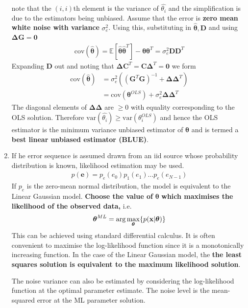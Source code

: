 \documentclass[a4paper]{article}
\newcommand{\ix}[1]{%
  \leavevmode %
  \marginpar{\small\emph{#1}}%
}
\newcommand{\expt}[1]{%
  \mathbb{E}[#1]
}
\newcommand{\vect}[1]{\boldsymbol{\mathbf{#1}}}
\DeclarePairedDelimiter{\mybrace}{\lbrace}{\rbrace}
\begin{document}
\begin{enumerate}
note that the \((i, i)\)th element is the variance of \(\hat{\theta_i}\) and the simplification is due to the estimators being unbiased. Assume that the error is \textbf{zero mean white noise with variance} \(\sigma_e^2\). Using this, substituting in \(\vect{\hat{\theta}}, \vect{D}\) and using \(\vect{\Delta G=0}\)
\begin{align*}
  \text{cov}(\vect{\hat{\theta}}) = \expt{\vect{\hat{\theta}}\vect{\hat{\theta}}^T} - \vect{\theta}\vect{\theta}^T = \sigma_e^2\vect{DD}^T
\end{align*}
Expanding \(\vect{D}\) out and noting that \(\vect{\Delta C}^T=\vect{C\Delta}^T=\vect{0}\) we  form
\begin{align*}
  \text{cov}(\vect{\hat{\theta}}) &= \sigma_e^2 ((\vect{G}^T\vect{G})^{-1} + \vect{\Delta \Delta}^T) \\
  &= \text{cov}(\vect{\theta}^{OLS}) + \sigma_e^2 \vect{\Delta \Delta}^T
\end{align*}
The diagonal elements of \(\vect{\Delta \Delta}\) are \(\geq 0\) with equality corresponding to the OLS solution. Therefore \(\text{var}(\hat{\theta_i})\geq \text{var}(\theta_i^{OLS})\) and hence the OLS estimator is the minimum variance unbiased estimator of \(\vect{\theta}\) and is termed a \textbf{best linear unbiased estimator (BLUE)}.\ix{Blue}

\item\ix{Likelihood Estimation}If he error sequence is assumed drawn from an iid source whose probability distribution is known, likelihood estimation may be used. 
\begin{align*}
  p(\vect{e}) = p_e(e_0)p_1(e_1)\ldots p_e(e_{N-1})
\end{align*}
If \(p_e\) is the zero-mean normal distribution, the model is equivalent to the Linear Gaussian model. \textbf{Choose the value of} \(\vect{\theta}\) \textbf{which maximises the likelihood of the observed data,} \vect{x} i.e.
\begin{align*}
  \vect{\theta}^{ML} = \arg\max_{\vect{\theta}}\mybrace{p(\vect{x}|\vect{\theta})} 
\end{align*}
This can be achieved using standard differential calculus. It is often convenient to maximise the log-likelihood function since it is a monotonically increasing function. In the case of the Linear Gaussian model, the \textbf{the least squares solution is equivalent to the maximum likelihood solution}.

The noise variance can also be estimated by considering the log-likelihood function at the optimal parameter estimate. The noise level is the mean-squared error at the ML parameter solution.



\end{enumerate}
\end{document}
